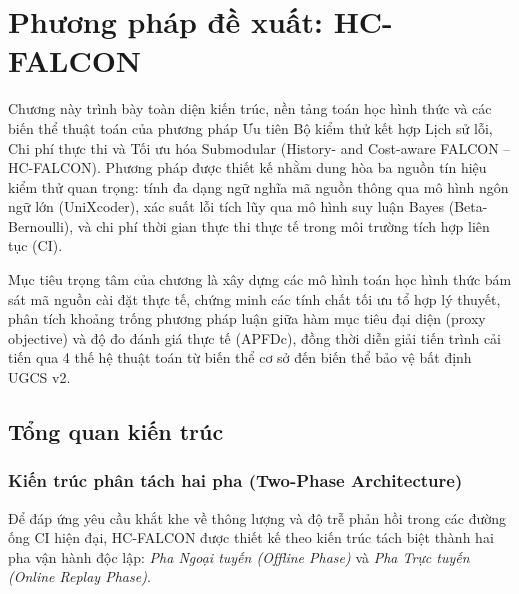 \section{Phương pháp đề xuất: HC-FALCON}
\label{sec:methodology}

Chương này trình bày toàn diện kiến trúc, nền tảng toán học hình thức và các biến thể thuật toán của phương pháp Ưu tiên Bộ kiểm thử kết hợp Lịch sử lỗi, Chi phí thực thi và Tối ưu hóa Submodular (History- and Cost-aware FALCON -- HC-FALCON). Phương pháp được thiết kế nhằm dung hòa ba nguồn tín hiệu kiểm thử quan trọng: tính đa dạng ngữ nghĩa mã nguồn thông qua mô hình ngôn ngữ lớn (UniXcoder), xác suất lỗi tích lũy qua mô hình suy luận Bayes (Beta-Bernoulli), và chi phí thời gian thực thi thực tế trong môi trường tích hợp liên tục (CI).

Mục tiêu trọng tâm của chương là xây dựng các mô hình toán học hình thức bám sát mã nguồn cài đặt thực tế, chứng minh các tính chất tối ưu tổ hợp lý thuyết, phân tích khoảng trống phương pháp luận giữa hàm mục tiêu đại diện (proxy objective) và độ đo đánh giá thực tế (APFDc), đồng thời diễn giải tiến trình cải tiến qua 4 thế hệ thuật toán từ biến thể cơ sở đến biến thể bảo vệ bất định UGCS v2.

\subsection{Tổng quan kiến trúc}
\label{subsec:architecture_overview}

\subsubsection{Kiến trúc phân tách hai pha (Two-Phase Architecture)}
\label{subsubsec:two_phase_arch}

Để đáp ứng yêu cầu khắt khe về thông lượng và độ trễ phản hồi trong các đường ống CI hiện đại, HC-FALCON được thiết kế theo kiến trúc tách biệt thành hai pha vận hành độc lập: \textit{Pha Ngoại tuyến (Offline Phase)} và \textit{Pha Trực tuyến (Online Replay Phase)}.

